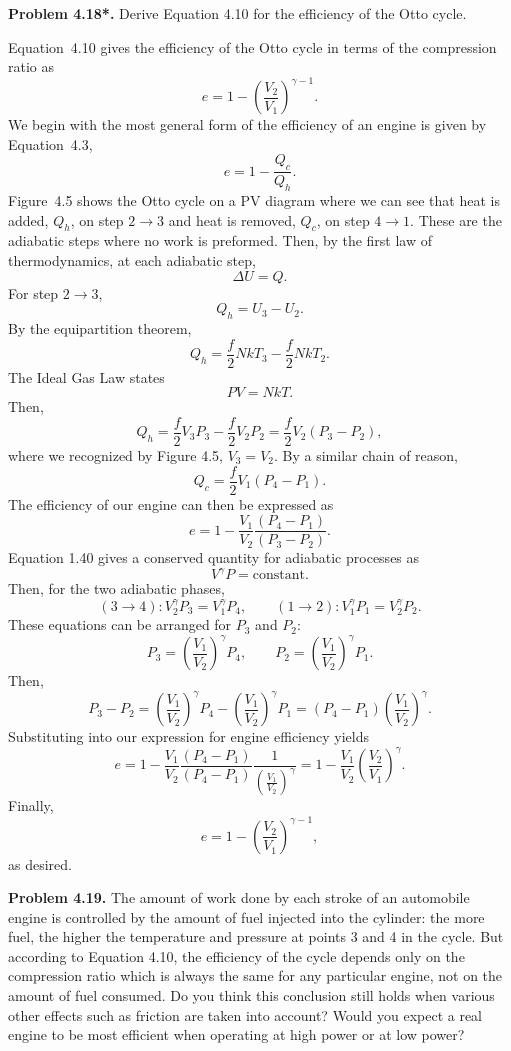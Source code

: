 \documentclass[a4paper, 12pt]{config/homework}
\begin{document}
\pagebreak\noindent
\textbf{Problem 4.18*.} Derive Equation 4.10 for the efficiency of the Otto cycle.

\bigskip\noindent
Equation~4.10 gives the efficiency of the Otto cycle in terms of the compression ratio as
\[e = 1 - \left(\frac{V_2}{V_1}\right)^{\gamma - 1}.\]
We begin with the most general form of the efficiency of an engine is given by Equation~4.3,
\[e = 1 - \frac{Q_c}{Q_h}.\]
Figure~4.5 shows the Otto cycle on a PV diagram where we can see that heat is added, \(Q_h\), on step \(2\to 3\) and heat is removed, \(Q_c\), on step \(4\to 1\). These are the adiabatic steps where no work is preformed. Then, by the first law of thermodynamics, at each adiabatic step,
\[\Delta U = Q.\]
For step \(2\to 3\),
\[Q_h = U_3 - U_2.\]
By the equipartition theorem,
\[Q_h = \frac{f}{2}NkT_3 - \frac{f}{2}NkT_2.\]
The Ideal Gas Law states
\[PV = NkT.\]
Then,
\[Q_h = \frac{f}{2}V_3 P_3 - \frac{f}{2}V_2 P_2 = \frac{f}{2}V_2(P_3 - P_2),\]
where we recognized by Figure 4.5, \(V_3=V_2\). By a similar chain of reason,
\[Q_c = \frac{f}{2}V_1(P_4-P_1).\]
The efficiency of our engine can then be expressed as
\[e = 1 - \frac{V_1}{V_2} \frac{(P_4-P_1)}{(P_3-P_2)}.\]
Equation 1.40 gives a conserved quantity for adiabatic processes as
\[V^\gamma P = \text{constant}.\]
Then, for the two adiabatic phases,
\[(3\to 4): V_2^\gamma P_3 = V_1^\gamma P_4, \qquad  (1\to 2): V_1^\gamma P_1 = V_2^\gamma P_2.\]
These equations can be arranged for \(P_3\) and \(P_2\):
\[P_3 = \left(\frac{V_1}{V_2}\right)^\gamma P_4, \qquad P_2 = \left(\frac{V_1}{V_2}\right)^\gamma P_1.\]
Then,
\[P_3 - P_2 = \left(\frac{V_1}{V_2}\right)^\gamma P_4 - \left(\frac{V_1}{V_2}\right)^\gamma P_1 = (P_4 - P_1)\left(\frac{V_1}{V_2}\right)^\gamma.\]
Substituting into our expression for engine efficiency yields
\[e = 1 - \frac{V_1}{V_2}\frac{(P_4-P_1)}{(P_4-P_1)}\frac{1}{\left(\frac{V_1}{V_2}\right)^\gamma} = 1 - \frac{V_1}{V_2}\left(\frac{V_2}{V_1}\right)^\gamma.\]
Finally,
\[e = 1 - \left(\frac{V_2}{V_1}\right)^{\gamma - 1},\]
as desired.

\pagebreak\noindent
\textbf{Problem 4.19.} The amount of work done by each stroke of an automobile engine is controlled by the amount of fuel injected into the cylinder: the more fuel, the higher the temperature and pressure at points 3 and 4 in the cycle. But according to Equation 4.10, the efficiency of the cycle depends only on the compression ratio which is always the same for any particular engine, not on the amount of fuel consumed. Do you think this conclusion still holds when various other effects such as friction are taken into account? Would you expect a real engine to be most efficient when operating at high power or at low power?
\end{document}
